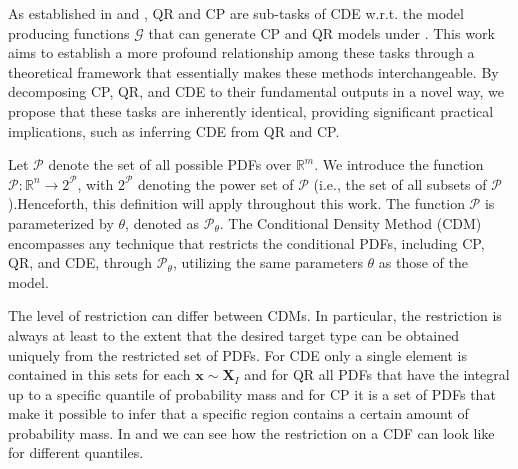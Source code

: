 As established in  and , QR and CP are sub-tasks of CDE w.r.t. the model producing functions $\mathcal{G}$ that can generate CP and QR models under . This work aims to establish a more profound relationship among these tasks through a theoretical framework that essentially makes these methods interchangeable. By decomposing CP, QR, and CDE to their fundamental outputs in a novel way, we propose that these tasks are inherently identical, providing significant practical implications, such as inferring CDE from QR and CP.

Let $\mathcal{P}$ denote the set of all possible PDFs over $\mathbb{R}^m$. We introduce the function $\mathscr{P}: \mathbb{R}^n \rightarrow 2^{\mathcal{P}}$, with $2^{\mathcal{P}}$ denoting the power set of $\mathcal{P}$ (i.e., the set of all subsets of $\mathcal{P}$).Henceforth, this definition will apply throughout this work. The function $\mathscr{P}$ is parameterized by $\theta$, denoted as $\mathscr{P}_\theta$. The Conditional Density Method (CDM) encompasses any technique that restricts the conditional PDFs, including CP, QR, and CDE, through $\mathscr{P}_\theta$, utilizing the same parameters $\theta$ as those of the model.

The level of restriction can differ between CDMs. In particular, the restriction is always at least to the extent that the desired target type can be obtained uniquely from the restricted set of PDFs. For CDE only a single element is contained in this sets for each $\mathbf{x} \sim \mathbf{X}_I$ and for QR all PDFs that have the integral up to a specific quantile of probability mass and for CP it is a set of PDFs that make it possible to infer that a specific region contains a certain amount of probability mass. In  and  we can see how the restriction on a CDF can look like for different quantiles.

